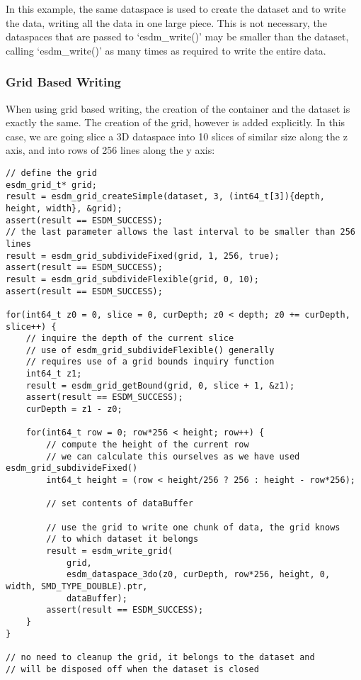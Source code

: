 In this example, the same dataspace is used to create the dataset and to
write the data, writing all the data in one large piece. This is not
necessary, the dataspaces that are passed to `esdm\_write()' may be
smaller than the dataset, calling `esdm\_write()' as many times as
required to write the entire data.

\subsubsection{Grid Based Writing}

When using grid based writing, the creation of the container and the
dataset is exactly the same. The creation of the grid, however is added
explicitly. In this case, we are going slice a 3D dataspace into 10
slices of similar size along the z axis, and into rows of 256 lines
along the y axis:

\begin{lstlisting}
// define the grid
esdm_grid_t* grid;
result = esdm_grid_createSimple(dataset, 3, (int64_t[3]){depth, height, width}, &grid);
assert(result == ESDM_SUCCESS);
// the last parameter allows the last interval to be smaller than 256 lines
result = esdm_grid_subdivideFixed(grid, 1, 256, true);  
assert(result == ESDM_SUCCESS);
result = esdm_grid_subdivideFlexible(grid, 0, 10);
assert(result == ESDM_SUCCESS);

for(int64_t z0 = 0, slice = 0, curDepth; z0 < depth; z0 += curDepth, slice++) {
    // inquire the depth of the current slice
    // use of esdm_grid_subdivideFlexible() generally 
    // requires use of a grid bounds inquiry function
    int64_t z1;
    result = esdm_grid_getBound(grid, 0, slice + 1, &z1);
    assert(result == ESDM_SUCCESS);
    curDepth = z1 - z0;

    for(int64_t row = 0; row*256 < height; row++) {
        // compute the height of the current row
        // we can calculate this ourselves as we have used esdm_grid_subdivideFixed()
        int64_t height = (row < height/256 ? 256 : height - row*256);

        // set contents of dataBuffer

        // use the grid to write one chunk of data, the grid knows 
        // to which dataset it belongs
        result = esdm_write_grid(
            grid, 
            esdm_dataspace_3do(z0, curDepth, row*256, height, 0, width, SMD_TYPE_DOUBLE).ptr, 
            dataBuffer);
        assert(result == ESDM_SUCCESS);
    }
}

// no need to cleanup the grid, it belongs to the dataset and 
// will be disposed off when the dataset is closed
\end{lstlisting}

